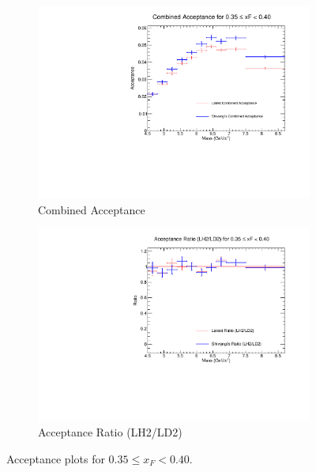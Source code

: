 \documentclass[11pt]{article}
\begin{document}
\begin{figure}[p]
\begin{subfigure}[b]{0.48\textwidth}
       \includegraphics[width=\linewidth]{./acceptancePlots/Combined_acceptance_xF_bin_7.pdf}
       \caption{Combined Acceptance}
    \end{subfigure}\hfill
    \begin{subfigure}[b]{0.48\textwidth}
       \includegraphics[width=\linewidth]{./acceptancePlots/Acceptance_ratio_xF_bin_7.pdf}
       \caption{Acceptance Ratio (LH2/LD2)}
    \end{subfigure}
    \caption{Acceptance plots for $0.35 \le x_F < 0.40$.}
\end{figure}
\end{document}
